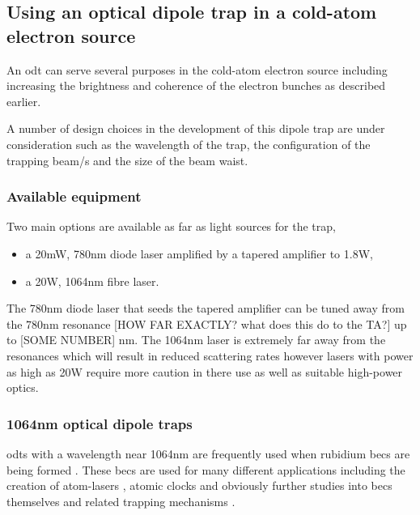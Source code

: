 \subsection{Using an optical dipole trap in a cold-atom electron source}
An \gls{odt} can serve several purposes in the cold-atom electron source including increasing the brightness and coherence of the electron bunches as described earlier.

A number of design choices in the development of this dipole trap are under consideration such as the wavelength of the trap, the configuration of the trapping beam/s and the size of the beam waist.

\subsubsection{Available equipment}
Two main options are available as far as light sources for the trap,
\begin{itemize}
    \item a 20mW, 780nm diode laser amplified by a tapered amplifier to 1.8W,
    \item a 20W, 1064nm fibre laser.
\end{itemize}

The 780nm diode laser that seeds the tapered amplifier can be tuned away from the 780nm resonance [HOW FAR EXACTLY? what does this do to the TA?] up to [SOME NUMBER] nm. The 1064nm laser is extremely far away from the resonances which will result in reduced scattering rates however lasers with power as high as 20W require more caution in there use as well as suitable high-power optics.

\subsubsection{1064nm optical dipole traps}
\Glspl{odt} with a wavelength near 1064nm are frequently used when rubidium \glspl{bec} are being formed \cite{chikkatur_continuous_2002, couvert_quasi-monomode_2008, kleine_buning_slow_2010, lin_rapid_2009, arnold_all-optical_2011, fu_bose-einstein_2011}. These \glspl{bec} are used for many different applications including the creation of atom-lasers \cite{kleine_buning_slow_2010, chikkatur_continuous_2002, couvert_quasi-monomode_2008}, atomic clocks\cite{kleine_buning_extended_2011} and obviously further studies into \glspl{bec} themselves and related trapping mechanisms \cite{arnold_all-optical_2011, fu_bose-einstein_2011, lin_rapid_2009}.

